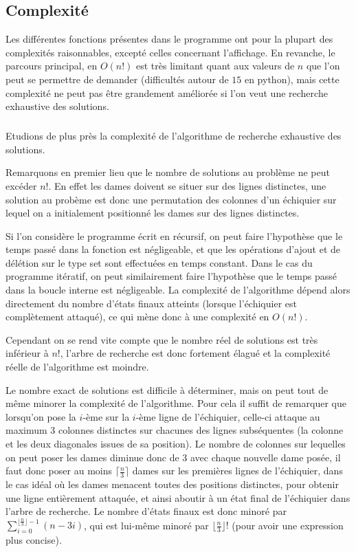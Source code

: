 \documentclass[a4paper]{article}
\begin{document}
\subsection{Complexité}
Les différentes fonctions présentes dans le programme ont pour la plupart des complexités raisonnables, excepté celles concernant l'affichage. En revanche, le parcours principal, en $O(n!)$ est très limitant quant aux valeurs de $n$ que l'on peut se permettre de demander (difficultés autour de $15$ en python), mais cette complexité ne peut pas être grandement améliorée si l'on veut une recherche exhaustive des solutions.

\subparagraph{}
Etudions de plus près la complexité de l'algorithme de recherche exhaustive des solutions.

Remarquons en premier lieu que le nombre de solutions au problème ne peut excéder $n!$. En effet les dames doivent se situer sur des lignes distinctes, une solution au probème est donc une permutation des colonnes d'un échiquier sur lequel on a initialement positionné les dames sur des lignes distinctes.

Si l'on considère le programme écrit en récursif, on peut faire l'hypothèse que le temps passé dans la fonction est négligeable, et que les opérations d'ajout et de délétion sur le type set sont effectuées en temps constant. Dans le cas du programme itératif, on peut similairement faire l'hypothèse que le temps passé dans la boucle interne est négligeable. La complexité de l'algorithme dépend alors directement du nombre d'états finaux atteints (lorsque l'échiquier est complètement attaqué), ce qui mène donc à une complexité en $O(n!)$.

Cependant on se rend vite compte que le nombre réel de solutions est très inférieur à $n!$, l'arbre de recherche est donc fortement élagué et la complexité réelle de l'algorithme est moindre.

Le nombre exact de solutions est difficile à déterminer, mais on peut tout de même minorer la complexité de l'algorithme. Pour cela il suffit de remarquer que lorsqu'on pose la $i$-ème sur la $i$-ème ligne de l'échiquier, celle-ci attaque au maximum $3$ colonnes distinctes sur chacunes des lignes subséquentes (la colonne et les deux diagonales issues de sa position). Le nombre de colonnes sur lequelles on peut poser les dames diminue donc de $3$ avec chaque nouvelle dame posée, il faut donc poser au moins $\lceil\frac{n}{3}\rceil$ dames sur les premières lignes de l'échiquier, dans le cas idéal où les dames menacent toutes des positions distinctes, pour obtenir une ligne entièrement attaquée, et ainsi aboutir à un état final de l'échiquier dans l'arbre de recherche. Le nombre d'états finaux est donc minoré par $\sum_{i=0}^{\lfloor\frac{n}{3}\rfloor-1}(n-3i)$, qui est lui-même minoré par $\lfloor\frac{n}{3}\rfloor!$ (pour avoir une expression plus concise).
\end{document}
